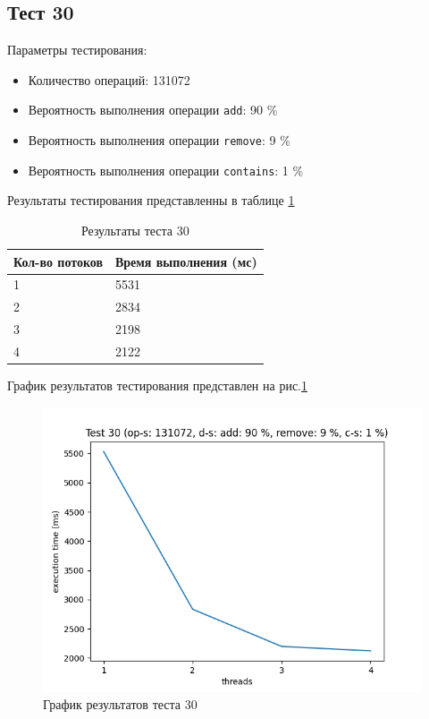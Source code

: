 \subsection*{Тест 30}

Параметры тестирования:

\begin{itemize}
    \item Количество операций: 131072
    \item Вероятность выполнения операции \verb|add|: 90 \%
    \item Вероятность выполнения операции \verb|remove|: 9 \%
    \item Вероятность выполнения операции \verb|contains|: 1 \%
\end{itemize}

Результаты тестирования представленны в таблице \ref{tab:results30}


\begin{table}[H]
    \centering
    \begin{tabular}{|l|l|}
        \hline
        Кол-во потоков & Время выполнения (мс) \\
        \hline
        1 & 5531 \\
        \hline
        2 & 2834 \\
        \hline
        3 & 2198 \\
        \hline
        4 & 2122 \\
        \hline
    \end{tabular}
    \caption{Результаты теста 30}
    \label{tab:results30}
\end{table}
        

График результатов тестирования представлен на рис.\ref{fig:plot30}

\begin{figure}[H]
    \centering
    \includegraphics[width=0.7\linewidth]{photo/plot30}
    \caption{График результатов теста 30}
    \label{fig:plot30}
\end{figure}

